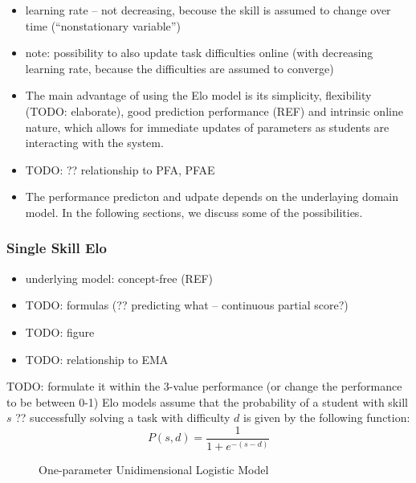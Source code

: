 \begin{itemize}
\item learning rate -- not decreasing, becouse the skill is assumed to change over time
  (``nonstationary variable'')
\item note: possibility to also update task difficulties online (with
  decreasing learning rate, because the difficulties are assumed to converge)
\item The main advantage of using the Elo model is its simplicity, flexibility (TODO: elaborate),
  good prediction performance (REF) and intrinsic online nature, which allows for immediate
  updates of parameters as students are interacting with the system.
\item TODO: ?? relationship to PFA, PFAE
\item The performance predicton and udpate depends on the underlaying domain model.
  In the following sections, we discuss some of the possibilities.
\end{itemize}

\subsubsection{Single Skill Elo}

\begin{itemize}
\item underlying model: concept-free (REF)
\item TODO: formulas (?? predicting what -- continuous partial score?)
\item TODO: figure
\item TODO: relationship to EMA
\end{itemize}

TODO: formulate it within the 3-value performance (or change the performance to be between 0-1)
Elo models assume  that the probability of a student with skill $s$
?? successfully solving a task with difficulty $d$
is given by the following function:
\begin{equation}\label{eq:logistic}
P(s, d) = \frac{1}{1 + e^{-(s - d)}}
\end{equation}

\begin{figure}[h]
  \centering
  \caption{One-parameter Unidimensional Logistic Model}
  \label{fig:logistic-model}
\end{figure}


